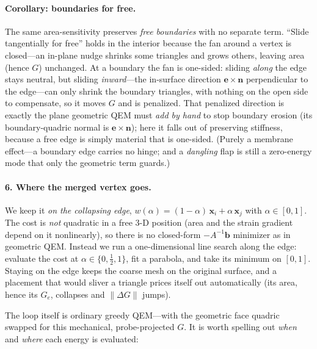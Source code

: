 \paragraph{Corollary: boundaries for free.}
The same area-sensitivity preserves \emph{free boundaries} with no separate term.
``Slide tangentially for free'' holds in the interior because the fan around a vertex is closed---an in-plane nudge shrinks some triangles and grows others, leaving area (hence $G$) unchanged.
At a boundary the fan is one-sided: sliding \emph{along} the edge stays neutral, but sliding \emph{inward}---the in-surface direction $\mathbf e\times\mathbf n$ perpendicular to the edge---can only shrink the boundary triangles, with nothing on the open side to compensate, so it moves $G$ and is penalized.
That penalized direction is exactly the plane geometric QEM must \emph{add by hand} to stop boundary erosion (its boundary-quadric normal is $\mathbf e\times\mathbf n$); here it falls out of preserving stiffness, because a free edge is simply material that is one-sided.
(Purely a membrane effect---a boundary edge carries no hinge; and a \emph{dangling} flap is still a zero-energy mode that only the geometric term guards.)

\paragraph{6. Where the merged vertex goes.}
We keep it \emph{on the collapsing edge}, $w(\alpha)=(1-\alpha)\,\mathbf{x}_i+\alpha\,\mathbf{x}_j$ with $\alpha\in[0,1]$.
The cost is \emph{not} quadratic in a free $3$-D position (area and the strain gradient depend on it nonlinearly), so there is no closed-form $-A^{-1}\mathbf{b}$ minimizer as in geometric QEM.
Instead we run a one-dimensional line search along the edge: evaluate the cost at $\alpha\in\{0,\tfrac12,1\}$, fit a parabola, and take its minimum on $[0,1]$.
Staying on the edge keeps the coarse mesh on the original surface, and a placement that would sliver a triangle prices itself out automatically (its area, hence its $G_e$, collapses and $\|\Delta G\|$ jumps).

\medskip
\noindent The loop itself is ordinary greedy QEM---with the geometric face quadric swapped for this mechanical, probe-projected $G$.
It is worth spelling out \emph{when} and \emph{where} each energy is evaluated:

